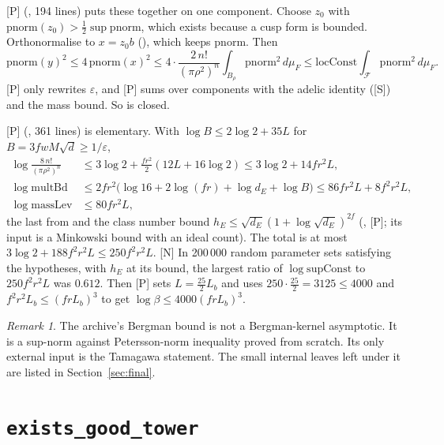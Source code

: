 \documentclass[11pt]{article}
\newcommand{\mP}{\textsf{[P]}}
\newcommand{\mS}{\textsf{[S]}}
\newcommand{\mN}{\textsf{[N]}}
\theoremstyle{remark}
\newtheorem{remark}[theorem]{Remark}
\begin{document}
\mP{}  (, 194 lines) puts these together on one component. Choose $z_0$ with $\mathrm{pnorm}(z_0)>\frac12\sup\mathrm{pnorm}$, which exists because a cusp form is bounded. Orthonormalise to $x=z_0b$ (), which keeps $\mathrm{pnorm}$. Then
\[
\mathrm{pnorm}(y)^2\le4\,\mathrm{pnorm}(x)^2\le4\cdot\frac{2\,n!}{(\pi\rho^2)^n}\int_{B_\rho}\mathrm{pnorm}^2\,d\mu_F\le\mathrm{locConst}\int_{\mathcal F}\mathrm{pnorm}^2\,d\mu_F.
\]
\mP{}  only rewrites $\varepsilon$, and \mP{}  sums over components with the adelic identity  (\mS) and the mass bound. So  is closed.

\mP{}  (, 361 lines) is elementary. With $\log B\le2\log2+35L$ for $B=3fwM\sqrt d\ge1/\varepsilon$,
\begin{align*}
\log\frac{8\,n!}{(\pi\rho^2)^n}&\le3\log2+\frac{fr^2}2(12L+16\log2)\le3\log2+14fr^2L,\\
\log\mathrm{multBd}&\le2fr^2\bigl(\log16+2\log(fr)+\log d_E+\log B\bigr)\le86fr^2L+8f^2r^2L,\\
\log\mathrm{massLev}&\le80fr^2L,
\end{align*}
the last from  and the class number bound $h_E\le\sqrt{d_E}(1+\log\sqrt{d_E})^{2f}$ (, \mP; its input  is a Minkowski bound with an ideal count). The total is at most $3\log2+188f^2r^2L\le250f^2r^2L$. \mN{} In 200\,000 random parameter sets satisfying the hypotheses, with $h_E$ at its bound, the largest ratio of $\log\mathrm{supConst}$ to $250f^2r^2L$ was $0.612$. Then \mP{}  sets $L=\frac{25}2L_b$ and uses $250\cdot\frac{25}2=3125\le4000$ and $f^2r^2L_b\le(frL_b)^3$ to get $\log\beta\le4000(frL_b)^3$.

\begin{remark}
The archive's Bergman bound is not a Bergman-kernel asymptotic. It is a sup-norm against Petersson-norm inequality proved from scratch. Its only external input is the Tamagawa statement. The small internal leaves left under it are listed in Section~\ref{sec:final}.
\end{remark}

\section{\texttt{exists\_good\_tower}}\label{sec:tower}
\end{document}
